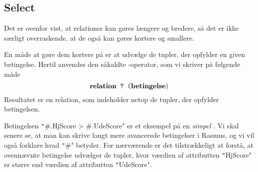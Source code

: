 \documentclass{article}
\newcounter{eks}
\begin{document}
\subsection{Select}
Det er ovenfor vist, at relationer kan g\o{}res l\ae{}ngere og bredere,
s\aa{} det er ikke s\ae{}rligt overraskende, at de ogs\aa{} kan g\o{}res
kortere og smallere.

En m\aa{}de at g\o{}re dem kortere p\aa{} er at udv\ae{}lge de tupler,
der opfylder en given betingelse. Hertil anvendes den s\aa{}kaldte
{\em {}}-operator, som vi skriver p\aa{} f\o{}lgende m\aa{}de
$$ \mbox{\bf relation} \mbox{\tt ~?~(} \mbox{\bf betingelse} ) $$
Resultatet er en relation, som indeholder netop de tupler, der opfylder
betingelsen.


Betingelsen \texttt"#.HjScore > #.UdeScore" er et eksempel p\aa{} en
{\em simpel\/} . Vi skal senere se, at man kan skrive langt
mere avancerede be\-ting\-elser i {\sc Rasmus}, og vi vil ogs\aa{} forklare
hvad \texttt"#" betyder. For n\ae{}r\-v\ae{}r\-en\-de er det tilstr\ae{}kkeligt
at forst\aa{}, at ovenn\ae{}vnte betingelse udv\ae{}lger de tup\-ler,
hvor v\ae{}rdien af attributten \texttt"HjScore" er st\o{}rre end
v\ae{}rdien af attributten \texttt"UdeScore".
\end{document}
